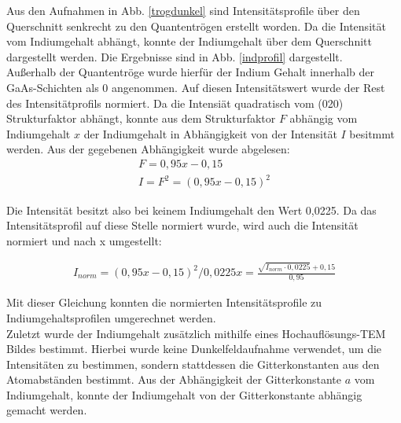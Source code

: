 \documentclass[a4paper,11pt,DIV=11]{scrartcl}
\begin{document}
Aus den Aufnahmen in Abb. \ref{trogdunkel} sind Intensitätsprofile über den Querschnitt senkrecht zu den Quantentrögen erstellt worden. Da die Intensität vom Indiumgehalt abhängt, konnte der Indiumgehalt über dem Querschnitt dargestellt werden. Die Ergebnisse sind in Abb. \ref{indprofil} dargestellt. \\
Außerhalb der Quantentröge wurde hierfür der Indium Gehalt innerhalb der GaAs-Schichten als 0 angenommen. Auf diesen Intensitätswert wurde der Rest des Intensitätprofils normiert. Da die Intensiät quadratisch vom (020) Strukturfaktor abhängt, konnte aus dem Strukturfaktor $F$ abhängig vom Indiumgehalt $x$ der Indiumgehalt in Abhängigkeit von der Intensität $I$ besitmmt werden. Aus der gegebenen Abhängigkeit wurde abgelesen:
\begin{align*}
	F = 0,95x - 0,15 \\
	I = F^2 = (0,95x - 0,15)^2 
\end{align*}

Die Intensität besitzt also bei keinem Indiumgehalt den Wert 0,0225. Da das Intensitätsprofil auf diese Stelle normiert wurde, wird auch die Intensität normiert und nach x umgestellt:

\begin{align*}
	I_{norm} = (0,95x - 0,15)^2 / 0,0225
	x = \frac{\sqrt{I_{norm}\cdot 0,0225}+0,15}{0,95}
\end{align*}

Mit dieser Gleichung konnten die normierten Intensitätsprofile zu Indiumgehaltsprofilen umgerechnet werden. \\
Zuletzt wurde der Indiumgehalt zusätzlich mithilfe eines Hochauflösungs-TEM Bildes bestimmt. Hierbei wurde keine Dunkelfeldaufnahme verwendet, um die Intensitäten zu bestimmen, sondern stattdessen die Gitterkonstanten aus den Atomabständen bestimmt. Aus der Abhängigkeit der Gitterkonstante $a$ vom Indiumgehalt, konnte der Indiumgehalt von der Gitterkonstante abhängig gemacht werden. \\
\end{document}
